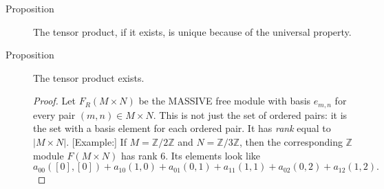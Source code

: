 \documentclass[12pt]{article}
\newcommand{\bbZ}{\mathbb{Z}}
\begin{document}
\begin{description}
\begin{tikzpicture}
    \end{tikzpicture}
  \item[Proposition] The tensor product, if it exists, is unique
    because of the universal property. 
  \item[Proposition] The tensor product exists.
    \begin{proof}
      Let $F_R(M\times N)$ be the MASSIVE free module with basis
      $e_{m,n}$ for every pair $(m,n)\in M\times N$. This is not just
      the set of ordered pairs: it is the set with a basis element for
      each ordered pair. It has \emph{rank} equal to $\lvert M\times
      N\rvert$.
      [Example:]
        If $M=\bbZ/2\bbZ$ and $N=\bbZ/3\bbZ$, then the corresponding
        $\bbZ$ module $F(M\times N)$ has rank $6$. Its elements look
        like \[a_{00} ([0],[0])+a_{10}(1,0) + a_{01}(0,1)+a_{11}(1,1)+a_{02}(0,2)+a_{12}(1,2).\]
      

\end{proof}
\end{description}
\end{document}
